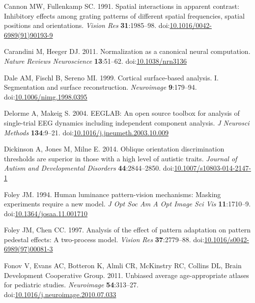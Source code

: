 \documentclass[
]{article}
\newlength{\cslhangindent}
\newlength{\cslentryspacingunit} %
\newenvironment{CSLReferences}[2] %
 {%
  \setlength{\parindent}{0pt}
  \ifodd #1
  \let\oldpar\par
  \def\par{\hangindent=\cslhangindent\oldpar}
  \fi
  \setlength{\parskip}{#2\cslentryspacingunit}
 }%
 {}
\begin{document}
\begin{CSLReferences}{1}{0}
\leavevmode{}%
Cannon MW, Fullenkamp SC. 1991. Spatial interactions in apparent contrast: Inhibitory effects among grating patterns of different spatial frequencies, spatial positions and orientations. \emph{Vision Res} \textbf{31}:1985--98. doi:\href{https://doi.org/10.1016/0042-6989(91)90193-9}{10.1016/0042-6989(91)90193-9}

\leavevmode{}%
Carandini M, Heeger DJ. 2011. Normalization as a canonical neural computation. \emph{Nature Reviews Neuroscience} \textbf{13}:51--62. doi:\href{https://doi.org/10.1038/nrn3136}{10.1038/nrn3136}

\leavevmode{}%
Dale AM, Fischl B, Sereno MI. 1999. Cortical surface-based analysis. I. Segmentation and surface reconstruction. \emph{Neuroimage} \textbf{9}:179--94. doi:\href{https://doi.org/10.1006/nimg.1998.0395}{10.1006/nimg.1998.0395}

\leavevmode{}%
Delorme A, Makeig S. 2004. EEGLAB: An open source toolbox for analysis of single-trial EEG dynamics including independent component analysis. \emph{J Neurosci Methods} \textbf{134}:9--21. doi:\href{https://doi.org/10.1016/j.jneumeth.2003.10.009}{10.1016/j.jneumeth.2003.10.009}

\leavevmode{}%
Dickinson A, Jones M, Milne E. 2014. Oblique orientation discrimination thresholds are superior in those with a high level of autistic traits. \emph{Journal of Autism and Developmental Disorders} \textbf{44}:2844--2850. doi:\href{https://doi.org/10.1007/s10803-014-2147-1}{10.1007/s10803-014-2147-1}

\leavevmode{}%
Foley JM. 1994. Human luminance pattern-vision mechanisms: Masking experiments require a new model. \emph{J Opt Soc Am A Opt Image Sci Vis} \textbf{11}:1710--9. doi:\href{https://doi.org/10.1364/josaa.11.001710}{10.1364/josaa.11.001710}

\leavevmode{}%
Foley JM, Chen CC. 1997. Analysis of the effect of pattern adaptation on pattern pedestal effects: A two-process model. \emph{Vision Res} \textbf{37}:2779--88. doi:\href{https://doi.org/10.1016/s0042-6989(97)00081-3}{10.1016/s0042-6989(97)00081-3}

\leavevmode{}%
Fonov V, Evans AC, Botteron K, Almli CR, McKinstry RC, Collins DL, Brain Development Cooperative Group. 2011. Unbiased average age-appropriate atlases for pediatric studies. \emph{Neuroimage} \textbf{54}:313--27. doi:\href{https://doi.org/10.1016/j.neuroimage.2010.07.033}{10.1016/j.neuroimage.2010.07.033}


\end{CSLReferences}
\end{document}

